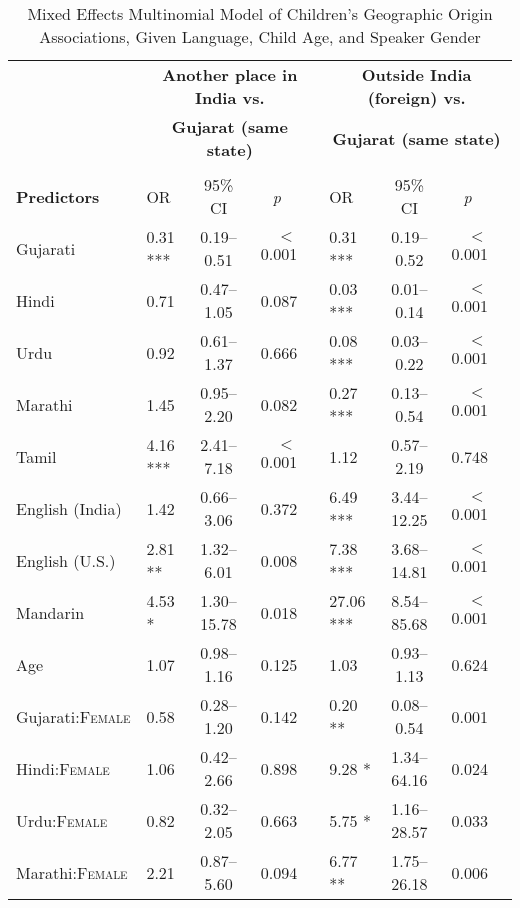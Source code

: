 \begin{table*}[t]
\small
\caption{Mixed Effects Multinomial Model of Children's Geographic Origin Associations, Given Language, Child Age, and Speaker Gender}\label{tab:geo-gender-mod}
    \centering
    \vspace{5pt}
\begin{threeparttable}
\begin{tabular}{llcrclcrc}
 \toprule
  & \multicolumn{4}{c}{\textbf{Another place in India vs.}} & \multicolumn{4}{c}{\textbf{Outside India (foreign) vs.}}\\
 & \multicolumn{4}{c}{\textbf{Gujarat (same state)\tnote{a}}} & \multicolumn{4}{c}{\textbf{Gujarat (same state)\tnote{a}}}\\
\cline{2-4} \cline{6-8}\\[-.75em]
\textbf{Predictors} & {OR} & {95\% CI} & \multicolumn{1}{c}{\textit{p}} & & {OR} & {95\% CI} & \multicolumn{1}{c}{\textit{p}} & \\ 
\midrule
 Gujarati & 0.31 *** & 0.19--0.51 & $<$0.001 &  & 0.31 *** & 0.19--0.52 & $<$0.001 \\ 
 Hindi & 0.71 & 0.47--1.05 & 0.087 &  & 0.03 *** & 0.01--0.14 & $<$0.001 \\ 
 Urdu & 0.92 & 0.61--1.37 & 0.666 &  & 0.08 *** & 0.03--0.22 & $<$0.001 \\ 
 Marathi & 1.45 & 0.95--2.20 & 0.082 &  & 0.27 *** & 0.13--0.54 & $<$0.001 \\ 
 Tamil & 4.16 *** & 2.41--7.18 & $<$0.001 &  & 1.12 & 0.57--2.19 & 0.748 \\ 
 English (India) & 1.42 & 0.66--3.06 & 0.372 &  & 6.49 *** & 3.44--12.25 & $<$0.001 \\ 
 English (U.S.) & 2.81 ** & 1.32--6.01 & 0.008 &  & 7.38 *** & 3.68--14.81 & $<$0.001 \\ 
 Mandarin & 4.53 * & 1.30--15.78 & 0.018 &  & 27.06 *** & 8.54--85.68 & $<$0.001 \\ 
 Age\tnote{b} & 1.07 & 0.98--1.16 & 0.125 &  & 1.03 & 0.93--1.13 & 0.624 \\ 
 Gujarati:\textsc{Female} & 0.58 & 0.28--1.20 & 0.142 &  & 0.20 ** & 0.08--0.54 & 0.001 \\ 
 Hindi:\textsc{Female} & 1.06 & 0.42--2.66 & 0.898 &  & 9.28 * & 1.34--64.16 & 0.024 \\ 
 Urdu:\textsc{Female} & 0.82 & 0.32--2.05 & 0.663 &  & 5.75 * & 1.16--28.57 & 0.033 \\ 
 Marathi:\textsc{Female} & 2.21 & 0.87--5.60 & 0.094 &  & 6.77 ** & 1.75--26.18 & 0.006 \\ 

\end{tabular}
\end{threeparttable}
\end{table*}
